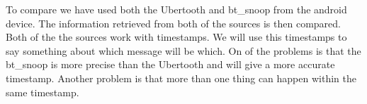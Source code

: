 To compare we have used both the Ubertooth and bt\_snoop from the android device. The information retrieved from both of the sources is then compared. Both of the the sources work with timestamps. We will use this timestamps to say something about which message will be which. On of the problems is that the bt\_snoop is more precise than the Ubertooth and will give a more accurate timestamp. Another problem is that more than one thing can happen within the same timestamp.
